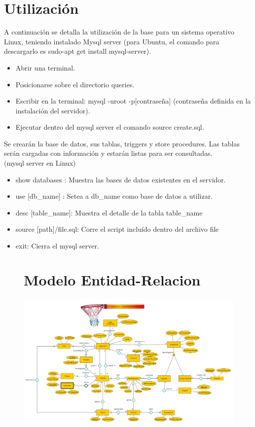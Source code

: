\documentclass[11pt, a4paper, spanish]{article}
\begin{document}
\section{Utilizaci\'on}
    A continuaci\'on se detalla la utilizaci\'on de la base para un sistema operativo Linux, 
    teniendo instalado Mysql server (para Ubuntu, el comando para descargarlo es sudo-apt get install mysql-server).\\

\begin{itemize}
    \item{Abrir una terminal.}
    \item{Posicionarse sobre el directorio queries.}
    \item{Escribir en la terminal: mysql -uroot -p[contrase\~{n}a] (contrase\~{n}a definida en la instalaci\'on del servidor).}
    \item{Ejecutar dentro del mysql server el comando source create.sql.}
\end{itemize}

Se crear\'an la base de datos, sus tablas, triggers y store procedures. Las tablas ser\'an cargadas con informaci\'on y estar\'an listas para ser consultadas.\\

 (mysql server en Linux)

\begin{itemize}
    \item{show databases :} Muestra las bases de datos existentes en el servidor.
    \item{use [db\_name] :} Setea a db\_name como base de datos a utilizar.
    \item{desc [table\_name]:} Muestra el detalle de la tabla table\_name
    \item{source [path]/file.sql:} Corre el script inclu\'ido dentro del archivo file
    \item{exit:} Cierra el mysql server.
\end{itemize}

\begin{figure}
\section{Modelo Entidad-Relacion}
  \centering
	\includegraphics[scale=0.42]{diagramas/DiagramaMER.png}\\
\end{figure}
\end{document}
